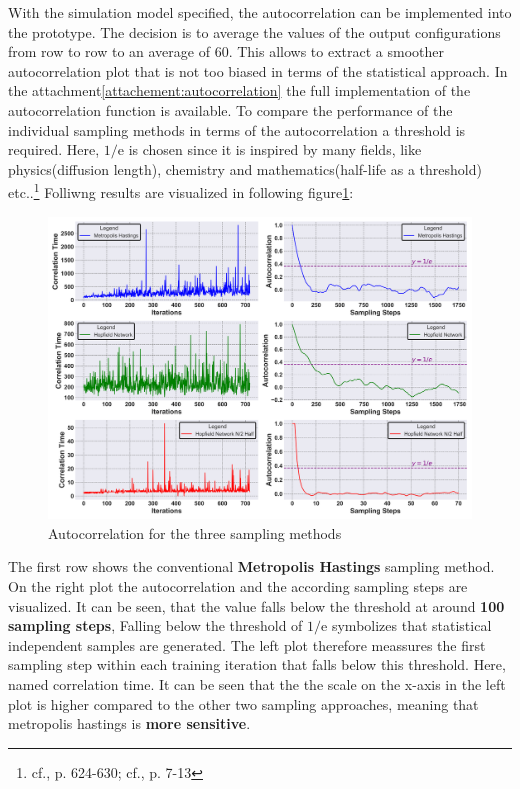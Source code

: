 With the simulation model specified, the autocorrelation can be implemented into the prototype. 
The decision is to average the values of the output configurations from row to row to an average of 60.
This allows to extract a smoother autocorrelation plot that is not too biased in terms of the statistical approach.
In the attachment\ref{attachement:autocorrelation} the full implementation of the autocorrelation function is available.
To compare the performance of the individual sampling methods in terms of the autocorrelation a threshold is required. 
Here, \(1/\mathrm{e}\) is chosen since it is inspired by many fields, like physics(diffusion length), chemistry and mathematics(half-life as a threshold) etc..\footnote{cf.\cite{archieStatisticalAnalysisHeterozygosity1985}, p. 624-630; cf.\cite{bohmNoiseinjectedAnalogIsing2022}, p. 7-13}
Folliwng results are visualized in following figure\ref{Autocorr comparison}:
\begin{figure}[H]
    \centering
    \includegraphics[width=1\linewidth]{graphics/Visualisierungen_Autocorr_individual_7.png}
    \caption{Autocorrelation for the three sampling methods}
    \label{Autocorr comparison}
\end{figure}

The first row shows the conventional \textbf{Metropolis Hastings} sampling method. On the right plot the autocorrelation
and the according sampling steps are visualized. It can be seen, that the value falls below the threshold at around \textbf{100 sampling steps}, 
Falling below the threshold of \(1/\mathrm{e}\) symbolizes that statistical independent samples are generated.
The left plot therefore meassures the first sampling step within each training iteration that falls below this threshold. 
Here, named correlation time. It can be seen that the the scale on the x-axis in the left plot is higher compared to the other two sampling approaches, 
meaning that metropolis hastings is \textbf{more sensitive}. 

